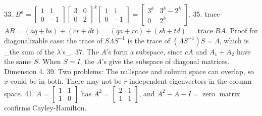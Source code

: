 33. \(B^{k}=\begin{bmatrix}1&1\\ 0&-1\end{bmatrix}\begin{bmatrix}3&0\\ 0&2\end{bmatrix}^{k}\begin{bmatrix}1&1\\ 0&-1\end{bmatrix}=\begin{bmatrix}3^{k}&3^{k}-2^{k}\\ 0&2^{k}\end{bmatrix}\).
35. trace \(AB=(aq+bs)+(cr+dt)=(qa+rc)+(sb+td)=\operatorname{trace}BA\). Proof for diagonalizable case: the trace of \(S\Lambda S^{-1}\) is the trace of \((\Lambda S^{-1})S=\Lambda\), which is _the sum of the \(\lambda\)'s_.
37. The \(A\)'s form a subspace, since \(cA\) and \(A_{1}+A_{2}\) have the same \(S\). When \(S=I\), the \(A\)'s give the subspace of diagonal matrices. Dimension 4.
39. Two problems: The nullspace and column space can overlap, so \(x\) could be in both. There may not be \(r\) independent eigenvectors in the column space.
41. \(A=\begin{bmatrix}1&1\\ 1&0\end{bmatrix}\) has \(A^{2}=\begin{bmatrix}2&1\\ 1&1\end{bmatrix}\), and \(A^{2}-A-I=\operatorname{zero}\) matrix confirms Cayley-Hamilton.

 